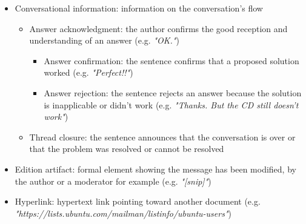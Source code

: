 \documentclass[11pt]{article}
\begin{document}
\begin{itemize}
\begin{itemize}
		\end{itemize}
	\item Conversational information: information on the conversation's flow
		\begin{itemize}
			\item Answer acknowledgment: the author confirms the good reception and understanding of an answer (e.g. \textit{"OK."})
				\begin{itemize}
					\item Answer confirmation: the sentence confirms that a proposed solution worked (e.g. \textit{"Perfect!!"})
					\item Answer rejection: the sentence rejects an answer because the solution is inapplicable or didn't work (e.g. \textit{"Thanks. But the CD still doesn't work"})
				\end{itemize}
			\item Thread closure: the sentence announces that the conversation is over or that the problem was resolved or cannot be resolved
		\end{itemize}
	\item Edition artifact: formal element showing the message has been modified, by the author or a moderator for example (e.g. \textit{"[snip]"})
	\item Hyperlink: hypertext link pointing toward another document (e.g. \textit{"https://lists.ubuntu.com/mailman/listinfo/ubuntu-users"})
\end{itemize}

\end{document}

